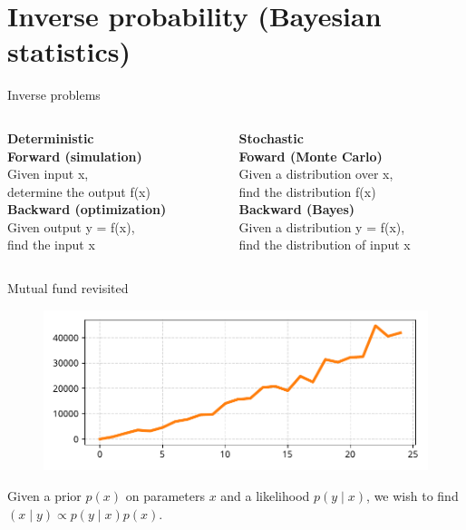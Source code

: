 \documentclass[12pt, aspectratio=149]{beamer}
\theoremstyle{plain}
\begin{document}
\section{Inverse probability (Bayesian statistics)}

\begin{frame}[fragile]{Inverse problems}
\begin{columns}
\begin{column}{0.5\textwidth}
    \begin{center}
\textbf{Deterministic}\\
\vspace*{2em}
\textbf{Forward (simulation)} \\
Given input x,\\determine the output f(x) \\
\vspace*{1em}
\textbf{Backward (optimization)} \\
Given output y = f(x),\\find the input x
     \end{center}
\end{column}
\begin{column}{0.5\textwidth}  %
    \begin{center}
\textbf{Stochastic}\\
\vspace*{2em}
\textbf{Foward (Monte Carlo)} \\
Given a distribution over x,\\find the distribution f(x) \\
\vspace*{1em}
\textbf{Backward (Bayes)} \\
Given a distribution y = f(x),\\find the distribution of input x
     \end{center}
\end{column}
\end{columns}
\end{frame}


\begin{frame}[fragile]{Mutual fund revisited}
\vspace*{-1em}
\begin{center}
 \begin{figure}
    	\centering
    	\includegraphics[width=0.99\linewidth]{figures/esmda_observations.pdf}
 \end{figure}
 Given a prior $p(x)$ on parameters $x$ and a likelihood $p(y \mid x)$,
 we wish to find $(x \mid y) \propto p(y \mid x) p(x)$.
 \end{center}
\end{frame}
\end{document}
